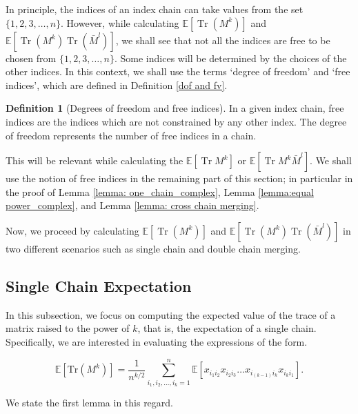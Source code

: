 \documentclass[12pt]{amsart}
\theoremstyle{plain}
\theoremstyle{definition}
\newtheorem{defn}[Thm]{Definition}
\newcommand{\Tr}{\operatorname{Tr}}
\begin{document}
In principle, the indices of an index chain can take values from the set $\{1, 2, 3, \ldots, n\}$. However, while calculating $\mathbb{E}[\Tr(M^{k})]$ and $\mathbb{E}[\Tr(M^{k})\Tr(\bar M^{l})]$, we shall see that not all the indices are free to be chosen from $\{1, 2, 3, \ldots, n\}.$ Some indices will be determined by the choices of the other indices. In this context, we shall use the terms `degree of freedom' and `free indices', which are defined in Definition \ref{dof and fv}.

\begin{defn}[Degrees of freedom and free indices]{\label{dof and fv}}
  In a given index chain, free indices are the indices which are not constrained by any other index. The degree of freedom represents the number of free indices in a chain.
\end{defn}
This will be relevant while calculating the $\mathbb{E}[\Tr M^{k}]$ or $\mathbb{E}[\Tr M^{k}\bar{M}^{l}].$ We shall use the notion of free indices in the remaining part of this section; in particular in the proof of Lemma \ref{lemma: one_chain_complex}, Lemma \ref{lemma:equal power_complex}, and Lemma \ref{lemma: cross chain merging}.


Now, we proceed by calculating $\mathbb{E}[\Tr(M^{k})]$ and $\mathbb{E}[\Tr(M^{k})\Tr(\bar{M}^{l})]$ in two different scenarios such as single chain and double chain merging.

\subsection{Single Chain Expectation}\label{sec: single chain expectation}

 In this subsection, we focus on computing the expected value of the trace of a matrix raised to the power of $k$, that is, the expectation of a single chain. Specifically, we are interested in evaluating the expressions of the form.

$$
\mathbb{E}[\mathrm{Tr}(M^{k})] = \frac{1}{n^{ {k/2}}}\sum_{i_{1},i_{2},\dots,i_{k}=1}^{n}\mathbb{E}[x_{i_{1}i_{2}}x_{i_{2}i_{3}} \dots x_{i_{(k-1)}i_{k}}x_{i_{k}i_{1}}].
$$

We state the first lemma in this regard.
\end{document}
